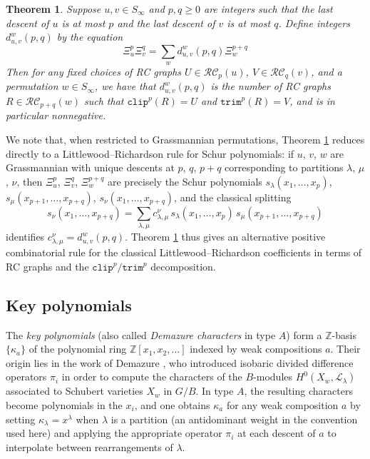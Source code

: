 \documentclass{amsart}
\newtheorem{theorem}{Theorem}[section]
\theoremstyle{definition}
\theoremstyle{remark}
\numberwithin{equation}{subsection}
\newcommand{\trm}{\mathtt{trim}}
\newcommand{\clp}{\mathtt{clip}}
\newcommand{\RC}{\mathcal{RC}}
\newcommand{\dsch}{\ensuremath{\Xi}}
\begin{document}
\begin{theorem}\label{theorem:LR}
Suppose $u,v\in S_\infty$ and $p,q\geq 0$ are integers such that the last descent of $u$ is at most $p$ and the last descent of $v$ is at most $q$. Define integers $d_{u,v}^w(p, q)$ by the equation
$$\dsch_u^p\dsch_v^q = \sum_{w} d_{u,v}^w(p, q)\dsch_w^{p+q}$$
Then for any fixed choices of RC graphs $U\in \RC_p(u)$, $V\in\RC_q(v)$, and a permutation $w\in S_\infty$, we have that $d_{u, v}^w(p, q)$ is the number of RC graphs $R\in \RC_{p+q}(w)$ such that $\clp^p(R)=U$ and $\trm^p(R)=V$, and is in particular nonnegative.
\end{theorem}

We note that, when restricted to Grassmannian permutations, Theorem \ref{theorem:LR} reduces directly to a Littlewood--Richardson rule for Schur polynomials: if $u$, $v$, $w$ are Grassmannian with unique descents at $p$, $q$, $p+q$ corresponding to partitions $\lambda$, $\mu$, $\nu$, then $\dsch^p_u$, $\dsch^q_v$, $\dsch^{p+q}_w$ are precisely the Schur polynomials $s_\lambda(x_1,\ldots,x_p)$, $s_\mu(x_{p+1},\ldots,x_{p+q})$, $s_\nu(x_1,\ldots,x_{p+q})$, and the classical splitting
$$s_\nu(x_1,\ldots,x_{p+q}) = \sum_{\lambda,\mu} c^{\nu}_{\lambda,\mu}\, s_\lambda(x_1,\ldots,x_p)\, s_\mu(x_{p+1},\ldots,x_{p+q})$$
identifies $c^{\nu}_{\lambda,\mu} = d^{w}_{u,v}(p,q)$. Theorem \ref{theorem:LR} thus gives an alternative positive combinatorial rule for the classical Littlewood--Richardson coefficients in terms of RC graphs and the $\clp^p / \trm^p$ decomposition.
\newcommand{\forest}{\mathfrak{P}}
\newcommand{\fcode}{\mathfrak{c}_f}
\subsection*{Key polynomials}

The \emph{key polynomials} (also called \emph{Demazure characters} in type $A$) form a $\mathbb{Z}$-basis $\{\kappa_a\}$ of the polynomial ring $\mathbb{Z}[x_1,x_2,\ldots]$ indexed by weak compositions $a$. Their origin lies in the work of Demazure \cite{demazure1974desingularisation,demazure1974nouvelle}, who introduced isobaric divided difference operators $\pi_i$ in order to compute the characters of the $B$-modules $H^0(X_w,\mathcal{L}_\lambda)$ associated to Schubert varieties $X_w$ in $G/B$. In type $A$, the resulting characters become polynomials in the $x_i$, and one obtains $\kappa_a$ for any weak composition $a$ by setting $\kappa_\lambda = x^\lambda$ when $\lambda$ is a partition (an antidominant weight in the convention used here) and applying the appropriate operator $\pi_i$ at each descent of $a$ to interpolate between rearrangements of $\lambda$.
\end{document}
